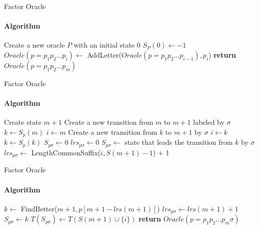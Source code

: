 \begin{frame}[fragile]{Factor Oracle}
  \framesubtitle{Algorithm}
  \begin{algorithm}[H]
    \caption{Construction of a Factor Oracle}\label{alg:fo}
    \begin{algorithmic}[1]
      \State Create a new oracle $P$ with an initial state 0
      \State $S_{P}(0) \gets -1$
      \State $Oracle(p=p_{1}p_{2}\dots{}p_{i}) \gets$
      AddLetter($Oracle(p=p_{1}p_{2}\dots{}p_{i-1}), p_{i}$)
      \EndFor
      \State  \textbf{return} $Oracle(p=p_{1}p_{2}\dots{}p_{m})$
      \EndFunction
    \end{algorithmic}
  \end{algorithm}
\end{frame}

\begin{frame}[fragile]{Factor Oracle}
  \framesubtitle{Algorithm}
  \begin{algorithm}[H]
    \caption{Incremental update of Factor Oracle}\label{alg:addletter}
    \begin{algorithmic}[1]
      \State Create state $m+1$
      \State Create a new transition from $m$ to $m+1$ labeled by
      $\sigma$ 
      \State $k \gets S_{p}(m)$
      \State $i \gets m$
      \State Create a new transition from $k$ to $m+1$ by $\sigma$  
      \State $i \gets k$
      \State $k \gets S_{p}(k)$
      \EndWhile
      \State $S_{p\sigma} \gets 0$
      \State $lrs_{p\sigma} \gets 0$
      \Else
      \State $S_{p\sigma}\gets $ state that leads the transition
      from $k$ by $\sigma$
      \State $lrs_{p\sigma} \gets $ LengthCommonSuffix($i,S(m+1)-1$) + 1
      \EndIf
    \end{algorithmic}
  \end{algorithm}
\end{frame}


\begin{frame}[fragile]{Factor Oracle}
  \framesubtitle{Algorithm}
  \begin{algorithm}[H]
    \caption{Incremental update of Factor Oracle}
    \begin{algorithmic}[1]
      \State $k \gets $ FindBetter($m+1, p[m+1-lrs(m+1)]$)
      \State $lrs_{p\sigma} \gets lrs(m+1) +1$
      \State $S_{p\sigma} \gets k$
      \EndIf
      \State $T(S_{p\sigma}) \gets T(S(m+1) \cup \{i\})$
      \State \textbf{return} $Oracle(p=p_{1}p_{2}\dots{}p_{m}\sigma)$
      \EndFunction
    \end{algorithmic}
  \end{algorithm}
\end{frame}

